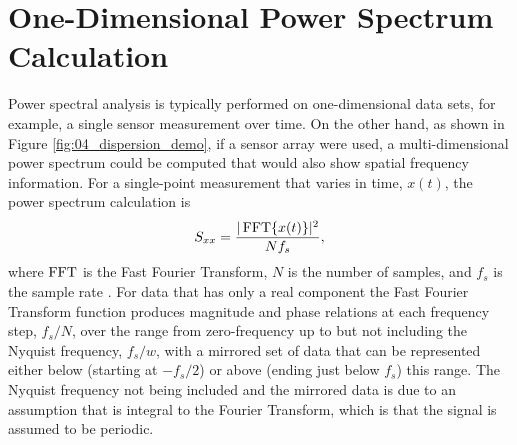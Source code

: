 \section{One-Dimensional Power Spectrum Calculation}
Power spectral analysis is typically performed on one-dimensional data sets, for example, a single sensor measurement over time.
On the other hand, as shown in Figure \ref{fig:04_dispersion_demo}, if a sensor array were used, a multi-dimensional power spectrum could be computed that would also show spatial frequency information.
For a single-point measurement that varies in time, $x(t)$, the power spectrum calculation is
\begin{equation}
 S_{xx} = \frac{|\operatorname{FFT}\{x(t)\}|^2}{Nf_{s}} \textrm{,}
 \label{eqn:04_basic_sxx}
\end{equation}
where $\operatorname{FFT}$ is the Fast Fourier Transform, $N$ is the number of samples, and $f_{s}$ is the sample rate \cite{Blackman-1958-4QtKgDb8}.
For data that has only a real component the Fast Fourier Transform function produces magnitude and phase relations at each frequency step, $f_{s}/N$, over the range from zero-frequency up to but not including the Nyquist frequency, $f_s/w$, with a mirrored set of data that can be represented either below (starting at $-f_s/2$) or above (ending just below $f_s$) this range.
The Nyquist frequency not being included and the mirrored data is due to an assumption that is integral to the Fourier Transform, which is that the signal is assumed to be periodic.

